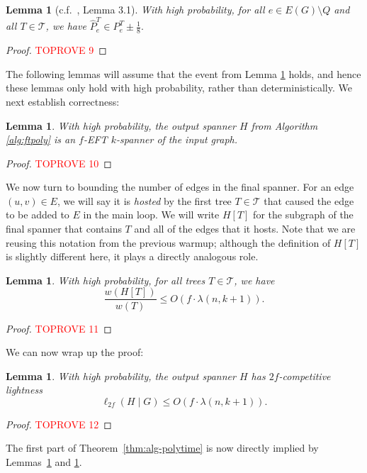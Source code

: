 \documentclass{article}
\theoremstyle{plain}
\newtheorem{lemma}[theorem]{Lemma}
\theoremstyle{definition}
\newcommand{\tee}{\mathcal{T}}
\begin{document}
\begin{lemma} [c.f.~\cite{BDR21}, Lemma 3.1] \label{lem:whpguarantee}
With high probability, for all $e \in E(G) \setminus Q$ and all $T \in \mathcal{T}$, we have
$\widehat{P}^T_e \in P^T_e \pm \frac{1}{8}.$
\end{lemma}
\begin{proof}\textcolor{red}{TOPROVE 9}\end{proof}

The following lemmas will assume that the event from Lemma \ref{lem:whpguarantee} holds, and hence these lemmas only hold with high probability, rather than deterministically.
We next establish correctness:
\begin{lemma} \label{lem:poly-correct}
With high probability, the output spanner $H$ from Algorithm \ref{alg:ftpoly} is an $f$-EFT $k$-spanner of the input graph.
\end{lemma}
\begin{proof}\textcolor{red}{TOPROVE 10}\end{proof}

We now turn to bounding the number of edges in the final spanner.
For an edge $(u, v) \in E$, we will say it is \emph{hosted} by the first tree $T \in \tee$ that caused the edge to be added to $E$ in the main loop.
We will write $H[T]$ for the subgraph of the final spanner that contains $T$ and all of the edges that it hosts.
Note that we are reusing this notation from the previous warmup; although the definition of $H[T]$ is slightly different here, it plays a directly analogous role.

\begin{lemma} \label{lem:polyhostbound}
With high probability, for all trees $T \in \mathcal{T}$, we have
$$\frac{w(H[T])}{w(T)} \le O\left(f \cdot \lambda(n, k+1)\right).$$
\end{lemma}
\begin{proof}\textcolor{red}{TOPROVE 11}\end{proof}

We can now wrap up the proof:
\begin{lemma} \label{lem:poly-light}
With high probability, the output spanner $H$ has $2f$-competitive lightness
$$\ell_{2f}(H \mid G) \le O\left( f \cdot \lambda(n, k+1) \right).$$
\end{lemma}
\begin{proof}\textcolor{red}{TOPROVE 12}\end{proof}

The first part of Theorem~\ref{thm:alg-polytime} is now directly implied by Lemmas~\ref{lem:poly-correct} and \ref{lem:poly-light}.
\end{document}
